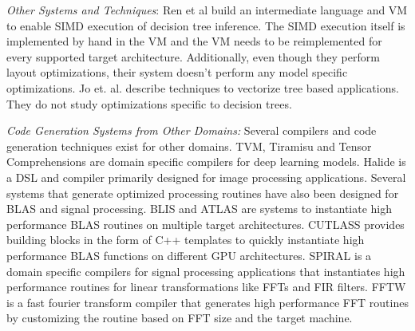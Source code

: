 \emph{Other Systems and Techniques}: 
Ren et al \cite{PortableVM} build an intermediate language and VM to 
enable SIMD execution of decision tree inference. The SIMD execution itself is implemented 
by hand in the VM and the VM needs to be reimplemented for every supported target architecture.
Additionally, even though they perform layout optimizations, their system doesn't perform 
any model specific optimizations. Jo et. al.\cite{MilindTreeVectorization} describe techniques 
to vectorize tree based applications. They do not study optimizations specific to decision trees.

\emph{Code Generation Systems from Other Domains:}
Several compilers and code generation techniques exist for other domains.
TVM\cite{TVM}, Tiramisu\cite{Tiramisu} and Tensor 
Comprehensions\cite{TensorComprehensions} are domain specific compilers 
for deep learning models. Halide\cite{Halide} is a DSL and compiler 
primarily designed for image processing applications. Several systems
that generate optimized processing routines have also been designed 
for BLAS and signal processing. BLIS\cite{BLIS} and ATLAS\cite{atlas_sc98}
are systems to instantiate high performance BLAS routines on multiple 
target architectures. CUTLASS\cite{CUTLASS} provides building blocks 
in the form of C++ templates to quickly instantiate high performance 
BLAS functions on different GPU architectures. SPIRAL\cite{SPIRAL}
is a domain specific compilers for signal processing applications
that instantiates high performance routines for linear transformations 
like FFTs and FIR filters. FFTW\cite{FFTW} is a fast fourier transform 
compiler that generates high performance FFT routines by customizing 
the routine based on FFT size and the target machine.
